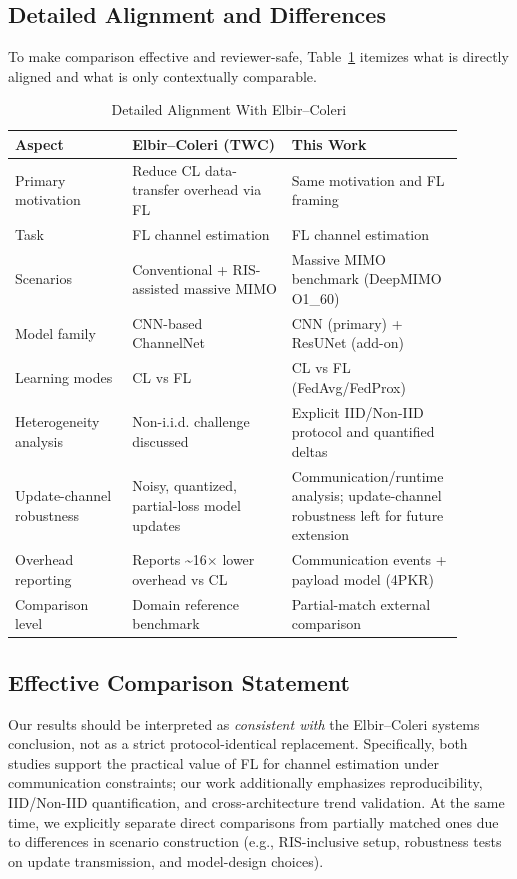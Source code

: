 \documentclass[onecolumn]{IEEEtran}
\begin{document}
\subsection{Detailed Alignment and Differences}
To make comparison effective and reviewer-safe, Table~\ref{tab:alignment_ec} itemizes what is directly aligned and what is only contextually comparable.

\begin{table}[t]
\caption{Detailed Alignment With Elbir--Coleri~\cite{elbir2021flchannel}}
\label{tab:alignment_ec}
\centering
\begin{tabular}{p{0.25\linewidth}p{0.34\linewidth}p{0.30\linewidth}}
\toprule
Aspect & Elbir--Coleri (TWC) & This Work \\
\midrule
Primary motivation & Reduce CL data-transfer overhead via FL & Same motivation and FL framing \\
Task & FL channel estimation & FL channel estimation \\
Scenarios & Conventional + RIS-assisted massive MIMO & Massive MIMO benchmark (DeepMIMO O1\_60) \\
Model family & CNN-based ChannelNet & CNN (primary) + ResUNet (add-on) \\
Learning modes & CL vs FL & CL vs FL (FedAvg/FedProx) \\
Heterogeneity analysis & Non-i.i.d. challenge discussed & Explicit IID/Non-IID protocol and quantified deltas \\
Update-channel robustness & Noisy, quantized, partial-loss model updates & Communication/runtime analysis; update-channel robustness left for future extension \\
Overhead reporting & Reports \textasciitilde16$\times$ lower overhead vs CL & Communication events + payload model (4PKR) \\
Comparison level & Domain reference benchmark & Partial-match external comparison \\
\bottomrule
\end{tabular}
\end{table}

\subsection{Effective Comparison Statement}
Our results should be interpreted as \emph{consistent with} the Elbir--Coleri systems conclusion, not as a strict protocol-identical replacement. Specifically, both studies support the practical value of FL for channel estimation under communication constraints; our work additionally emphasizes reproducibility, IID/Non-IID quantification, and cross-architecture trend validation. At the same time, we explicitly separate direct comparisons from partially matched ones due to differences in scenario construction (e.g., RIS-inclusive setup, robustness tests on update transmission, and model-design choices).
\end{document}
